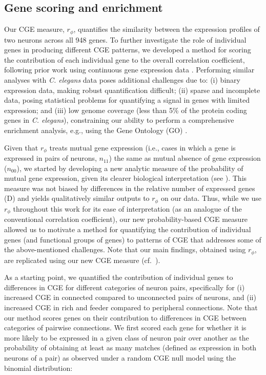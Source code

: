 \documentclass[10pt,letterpaper]{article}
\begin{document}
\subsection*{Gene scoring and enrichment}
Our CGE measure, $r_\phi$, quantifies the similarity between the expression profiles of two neurons across all 948 genes.
To further investigate the role of individual genes in producing different CGE patterns, we developed a method for scoring the contribution of each individual gene to the overall correlation coefficient, following prior work using continuous gene expression data \cite{Fulcher:2016ck}.
Performing similar analyses with \emph{C. elegans} data poses additional challenges due to:
(i) binary expression data, making robust quantification difficult;
(ii) sparse and incomplete data, posing statistical problems for quantifying a signal in genes with limited expression;
and (iii) low genome coverage (less than 5\% of the protein coding genes in \emph{C. elegans}), constraining our ability to perform a comprehensive enrichment analysis, e.g., using the Gene Ontology (GO) \cite{Ashburner2000}.

Given that $r_\phi$ treats mutual gene expression (i.e., cases in which a gene is expressed in pairs of neurons, $n_{11}$) the same as mutual absence of gene expression ($n_{00}$), we started by developing a new analytic measure of the probability of mutual gene expression, given its clearer biological interpretation (see ).
This measure was not biased by differences in the relative number of expressed genes (D) and yields qualitatively similar outputs to $r_\phi$ on our data.
Thus, while we use $r_\phi$ throughout this work for its ease of interpretation (as an analogue of the conventional correlation coefficient), our new probability-based CGE measure allowed us to motivate a method for quantifying the contribution of individual genes (and functional groups of genes) to patterns of CGE that addresses some of the above-mentioned challenges.
Note that our main findings, obtained using $r_\phi$, are replicated using our new CGE measure (cf.~).

As a starting point, we quantified the contribution of individual genes to differences in CGE for different categories of neuron pairs, specifically for (i) increased CGE in connected compared to unconnected pairs of neurons, and (ii) increased CGE in rich and feeder compared to peripheral connections.
Note that our method scores genes on their contribution to differences in CGE between categories of pairwise connections.
We first scored each gene for whether it is more likely to be expressed in a given class of neuron pair over another as the probability of obtaining at least as many matches (defined as expression in both neurons of a pair) as observed under a random CGE null model using the binomial distribution:
\end{document}
